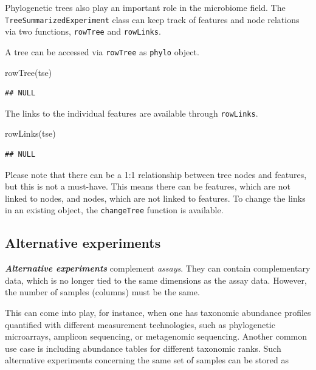 \documentclass[
]{book}
\newenvironment{Shaded}{\begin{snugshade}}{\end{snugshade}}
\newcommand{\FunctionTok}[1]{\textcolor[rgb]{0.00,0.00,0.00}{#1}}
\newcommand{\NormalTok}[1]{#1}
\begin{document}
Phylogenetic trees also play an important role in the microbiome field. The
\texttt{TreeSummarizedExperiment} class can keep track of features and node
relations via two functions, \texttt{rowTree} and \texttt{rowLinks}.

A tree can be accessed via \texttt{rowTree} as \texttt{phylo} object.

\begin{Shaded}
\begin{Highlighting}[]
\FunctionTok{rowTree}\NormalTok{(tse)}
\end{Highlighting}
\end{Shaded}

\begin{verbatim}
## NULL
\end{verbatim}

The links to the individual features are available through \texttt{rowLinks}.

\begin{Shaded}
\begin{Highlighting}[]
\FunctionTok{rowLinks}\NormalTok{(tse)}
\end{Highlighting}
\end{Shaded}

\begin{verbatim}
## NULL
\end{verbatim}

Please note that there can be a 1:1 relationship between tree nodes and
features, but this is not a must-have. This means there can be features, which
are not linked to nodes, and nodes, which are not linked to features. To change
the links in an existing object, the \texttt{changeTree} function is available.

\hypertarget{alt-exp}{%
\subsection{Alternative experiments}\label{alt-exp}}

\emph{\textbf{Alternative experiments}} complement \emph{assays}. They can contain
complementary data, which is no longer tied to the same dimensions as
the assay data. However, the number of samples (columns) must be the
same.

This can come into play, for instance, when one has taxonomic
abundance profiles quantified with different measurement technologies,
such as phylogenetic microarrays, amplicon sequencing, or metagenomic
sequencing. Another common use case is including abundance tables for
different taxonomic ranks. Such alternative experiments concerning the
same set of samples can be stored as
\end{document}
